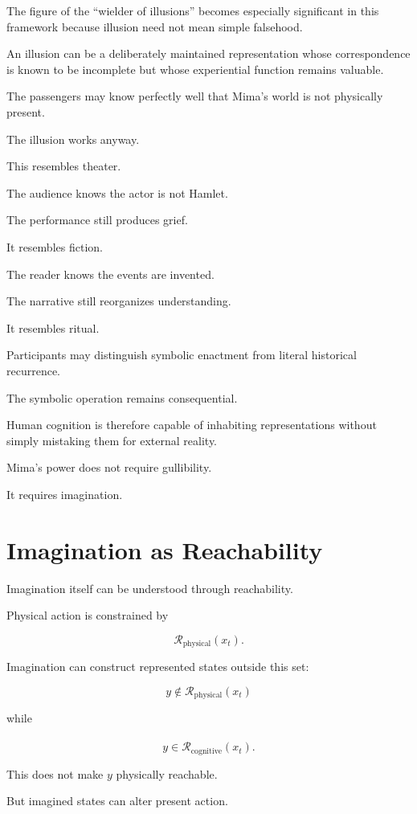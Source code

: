 \documentclass[11pt,oneside]{book}
\theoremstyle{definition}
\theoremstyle{remark}
\newcommand{\R}{\mathcal{R}}
\begin{document}
The figure of the ``wielder of illusions'' becomes especially significant in this framework because illusion need not mean simple falsehood.

An illusion can be a deliberately maintained representation whose correspondence is known to be incomplete but whose experiential function remains valuable.

The passengers may know perfectly well that Mima's world is not physically present.

The illusion works anyway.

This resembles theater.

The audience knows the actor is not Hamlet.

The performance still produces grief.

It resembles fiction.

The reader knows the events are invented.

The narrative still reorganizes understanding.

It resembles ritual.

Participants may distinguish symbolic enactment from literal historical recurrence.

The symbolic operation remains consequential.

Human cognition is therefore capable of inhabiting representations without simply mistaking them for external reality.

Mima's power does not require gullibility.

It requires imagination.

\section{Imagination as Reachability}

Imagination itself can be understood through reachability.

Physical action is constrained by

\[
\R_{\mathrm{physical}}(x_t).
\]

Imagination can construct represented states outside this set:

\[
y\notin\R_{\mathrm{physical}}(x_t)
\]

while

\[
y\in\widehat{\R}_{\mathrm{cognitive}}(x_t).
\]

This does not make \(y\) physically reachable.

But imagined states can alter present action.
\end{document}
